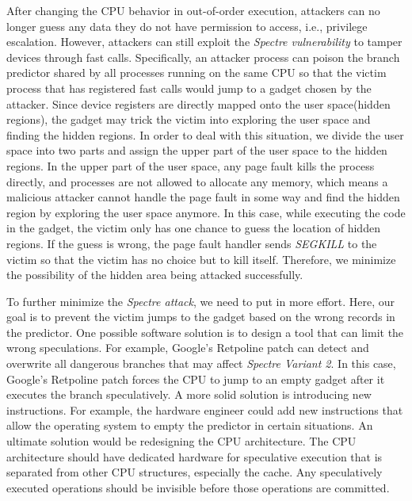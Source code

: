 After changing the CPU behavior in out-of-order execution, 
attackers can no longer guess any data they do not have permission 
to access, i.e., privilege escalation. However, attackers can still 
exploit the \emph{Spectre vulnerability}\cite{4} to tamper devices through fast calls. 
Specifically, an attacker process can poison the branch predictor 
shared by all processes running on the same CPU so that the victim 
process that has registered fast calls would jump to a gadget chosen 
by the attacker. Since device registers are directly mapped onto the 
user space(hidden regions), the gadget may trick the victim into 
exploring the user space and finding the hidden regions. 
In order to deal with this situation, we divide the user space into two 
parts and assign the upper part of the user space to the hidden regions. 
In the upper part of the user space, any page fault kills the process 
directly, and processes are not allowed to allocate any memory, 
which means a malicious attacker cannot handle the page fault in 
some way and find the hidden region by exploring the user space anymore. 
In this case, while executing the code in the gadget, the victim only 
has one chance to guess the location of hidden regions. If the guess is 
wrong, the page fault handler sends \emph{SEGKILL}\cite{21} to the 
victim so that the 
victim has no choice but to kill itself. Therefore, we minimize the 
possibility of the hidden area being attacked successfully.

To further minimize the \emph{Spectre attack}, we need to put in more effort. 
Here, our goal is to prevent the victim jumps to the gadget based on the wrong 
records in the predictor.  One possible software solution is to design a tool 
that can limit the wrong speculations. For example, Google's Retpoline patch can 
detect and overwrite all dangerous branches that may affect \emph{Spectre Variant 2}. 
In this case, Google's Retpoline patch forces the CPU to jump to an empty gadget 
after it executes the branch speculatively\cite{5}. A more solid solution is introducing 
new instructions\cite{5}.  For example, the hardware engineer could add new instructions 
that allow the operating system to empty the predictor in certain situations. 
An ultimate solution would be redesigning the CPU architecture. The CPU architecture 
should have dedicated hardware for speculative execution that is separated from other 
CPU structures, especially the cache. Any speculatively executed operations should be 
invisible before those operations are committed\cite{5}.  
 \cleardoublepage

